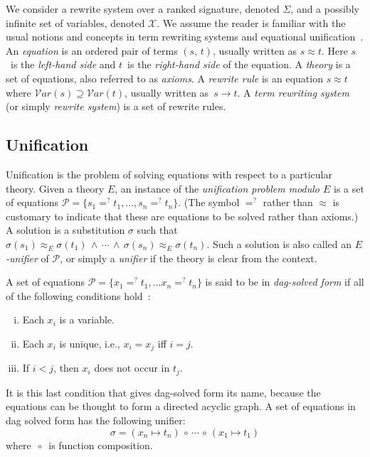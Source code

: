 \documentclass[11pt]{article}
\newcommand{\ueq}{=_{}^?}
\newcommand{\compcirc}{\, {\scriptstyle{\circ}} \,}
\newcommand{\X}{\mathcal{X}}
\newcommand{\p}{\mathcal{P}}
\newcommand{\Var}{\mathcal{V}\!ar}
\begin{document}
We consider a rewrite system over a ranked signature, denoted $\Sigma$, and a
possibly infinite set of variables, denoted $\X$. We assume the reader is
familiar with the usual notions and concepts in term rewriting systems and
equational unification~\cite{Term, BaaderSnyd-01}. An \emph{equation} is an
ordered pair of terms $(s, \, t)$, usually written as $s \approx t$. Here
$s$~is the \emph{le\vspace{-0.2pt}ft-hand side} and $t$~is the \emph{right-hand
side} of the equation. A \emph{theory} is a set of equations, also referred to
as \emph{axioms}. A \emph{rewrite rule} is an equation $s \approx t$ where
$\Var(s) \supseteq \Var(t)$, usually written as~$s \to t$. A \emph{term
rewriting system} (or simply \emph{rewrite system}) is a set of rewrite rules.

\subsection{Unification}\label{subsection:unification}

Unification is the problem of solving equations with respect to a particular
theory. Given a theory $E$, an instance of the \emph{unification problem modulo
$E$} is a set of equations $\p = \{s_1 \ueq t_1, \dotsc, s_n \ueq t_n\}$. (The
symbol $\ueq$ rather than $\approx$ is customary to indicate that these are
equations to be solved rather than axioms.) A solution is a substitution
$\sigma$ such that $\sigma(s_1) \approx^{}_E \sigma(t_1) \, \wedge \, \dotsb \,
\wedge \, \sigma(s_n) \approx^{}_E \sigma(t_n)$. Such a solution is also called
an \emph{$E$-unifier} of $\p$, or simply a \emph{unifier} if the theory is
clear from the context.

A set of equations $\p = \{x_1 \ueq t_1, \dotsc x_n \ueq t_n\}$ is said to be
in \emph{dag-solved form} if all of the following conditions
hold~\cite{jouannaud1991solving}:
\begin{enumerate}[(i)]
    \item Each $x_i$ is a variable.
    \item Each $x_i$ is unique, i.e., $x_i = x_j$ iff $i = j$.
    \item If $i < j$, then $x_i$ does not occur in $t_j$.
\end{enumerate}
It is this last condition that gives dag-solved form its name, because the
equations can be thought to form a directed acyclic graph. A set of equations
in dag solved form has the following unifier:
\[\sigma = (x_n \mapsto t_n) \compcirc \dotsb \compcirc (x_1 \mapsto t_1)\]
where $\compcirc$ is function composition.
\end{document}
